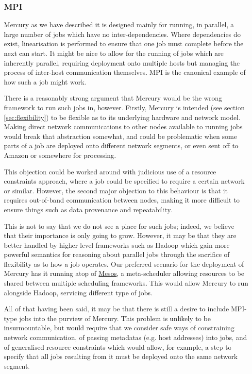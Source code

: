 \documentclass[10pt,a4paper]{article}
\newcommand{\npar}{\par\noindent\space}
\begin{document}
\subsubsection{MPI}
\npar Mercury as we have described it is designed mainly for running, in parallel, a large number of jobs which have no inter-dependencies. Where dependencies do exist, linearisation is performed to ensure that one job must complete before the next can start. It might be nice to allow for the running of jobs which are inherently parallel, requiring deployment onto multiple hosts but managing the process of inter-host communication themselves. MPI is the canonical example of how such a job might work.
\npar There is a reasonably strong argument that Mercury would be the wrong framework to run such jobs in, however. Firstly, Mercury is intended (see section \ref{sec:flexibility}) to be flexible as to its underlying hardware and network model. Making direct network communications to other nodes available to running jobs would break that abstraction somewhat, and could be problematic when some parts of a job are deployed onto different network segments, or even sent off to Amazon or somewhere for processing.
\npar This objection could be worked around with judicious use of a resource constraints approach, where a job could be specified to require a certain network or similar. However, the second major objection to this behaviour is that it requires out-of-band communication between nodes, making it more difficult to ensure things such as data provenance and repeatability.
\npar This is not to say that we do not see a place for such jobs; indeed, we believe that their importance is only going to grow. However, it may be that they are better handled by higher level frameworks such as Hadoop which gain more powerful semantics for reasoning about parallel jobs through the sacrifice of flexibility as to how a job operates. Our preferred scenario for the deployment of Mercury has it running atop of \href{http://mesos.apache.org/}{Mesos}, a meta-scheduler allowing resources to be shared between multiple scheduling frameworks. This would allow Mercury to run alongside Hadoop, servicing different type of jobs.
\npar All of that having been said, it may be that there is still a desire to include MPI-type jobs into the purview of Mercury. This problem is unlikely to be insurmountable, but would require that we consider safe ways of constraining network communication, of passing \glspl{metadata} (e.g. host addresses) into jobs, and of generalised resource constraints which would allow, for example, a \gls{step} to specify that all jobs resulting from it must be deployed onto the same network segment.
\end{document}

